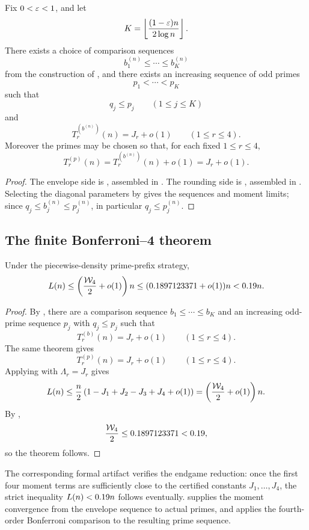 \begin{theorem}\label{thm:prime-bridge}
Fix $0<\varepsilon<1$, and let
\[
  K=\left\lfloor \frac{(1-\varepsilon)n}{2\log n}\right\rfloor.
\]
There exists a choice of comparison sequences
\[
  b_1^{(n)}\le \cdots \le b_K^{(n)}
\]
from the construction of , and there exists an
increasing sequence of odd primes
\[
  p_1<\cdots<p_K
\]
such that
\[
  q_j \le p_j \qquad (1\le j\le K)
\]
and
\[
  T_r^{(b^{(n)})}(n)=J_r+o(1)
  \qquad (1\le r\le 4).
\]
Moreover the primes may be chosen so that, for each fixed $1\le r\le 4$,
\[
  T_r^{(p)}(n)=T_r^{(b^{(n)})}(n)+o(1)=J_r+o(1).
\]
\end{theorem}

\begin{proof}
The envelope side is
,
assembled in .  The rounding side is
,
assembled in .  Selecting the diagonal
parameters by  gives the sequences and
moment limits; since $q_j\le b_j^{(n)}\le p_j^{(n)}$, in particular
$q_j\le p_j^{(n)}$.
\end{proof}

\subsection{The finite Bonferroni--4 theorem}

\begin{theorem}\label{thm:main-upper}
Under the piecewise-density prime-prefix strategy,
\[
  L(n) \le \left(\frac{\mathcal{W}_4}{2}+o(1)\right)n
  \le (0.1897123371+o(1))n < 0.19n.
\]
\end{theorem}

\begin{proof}
By , there are a comparison sequence
$b_1\le\cdots\le b_K$ and an increasing odd-prime sequence $p_j$ with
$q_j\le p_j$ such that
\[
  T_r^{(b)}(n)=J_r+o(1)
  \qquad (1\le r\le 4).
\]
The same theorem gives
\[
  T_r^{(p)}(n)=J_r+o(1)
  \qquad (1\le r\le 4).
\]
Applying  with $\Lambda_r=J_r$ gives
\[
  L(n)
  \le
  \frac n2\left(1-J_1+J_2-J_3+J_4+o(1)\right)
  =
  \left(\frac{\mathcal{W}_4}{2}+o(1)\right)n.
\]
By ,
\[
  \frac{\mathcal{W}_4}{2}\le0.1897123371<0.19,
\]
so the theorem follows.
\end{proof}

\begin{remark}
The corresponding formal artifact verifies the endgame reduction: once the first
four moment terms are sufficiently close to the certified constants
$J_1,\dots,J_4$, the strict inequality $L(n)<0.19n$ follows eventually.
 supplies the moment convergence from the envelope
sequence to actual primes, and  applies the fourth-order
Bonferroni comparison to the resulting prime sequence.
\end{remark}
